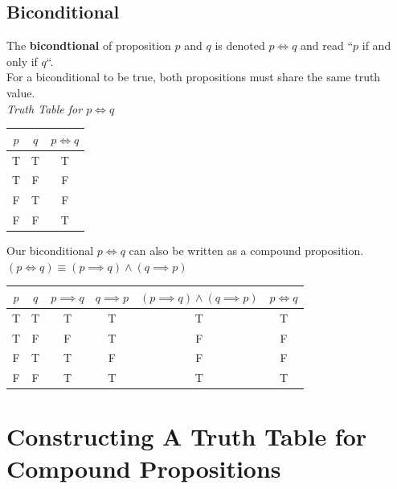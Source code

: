 \documentclass{article}
\begin{document}
\subsection{Biconditional}
The \textbf{bicondtional} of proposition $ p $ and $ q $ is denoted $ p \Longleftrightarrow{} q $ and read ``$ p $ if and only if $ q $``.\\


For a biconditional to be true, both propositions must share the same truth value. \\


\textit{Truth Table for $ p \Longleftrightarrow q $}
\begin{tabular}{|c|c|c|}
\hline
$ p $ & $ q $ & $ p \Longleftrightarrow q $ \\
\hline
T & T & T \\ 
T & F & F \\
F & T & F \\
F & F & T \\
\hline 
\end{tabular}


Our biconditional $ p \Longleftrightarrow q $ can also be written as a compound proposition. \\
$ (p \Longleftrightarrow q) \equiv (p \implies q) \land (q \implies p) $ \\


\begin{tabular}{|c|c|c|c|c|c|}
\hline
$ p $ & $ q $ & $ p \implies q $ & $ q \implies p $ & $ (p \implies q) \land (q \implies p) $ & $ p \Longleftrightarrow q $ \\
\hline
T & T & T & T & T & T \\ 
T & F & F & T & F & F \\
F & T & T & F & F & F \\
F & F & T & T & T & T \\
\hline 
\end{tabular}

\clearpage
\section{Constructing A Truth Table for Compound Propositions}
\end{document}
